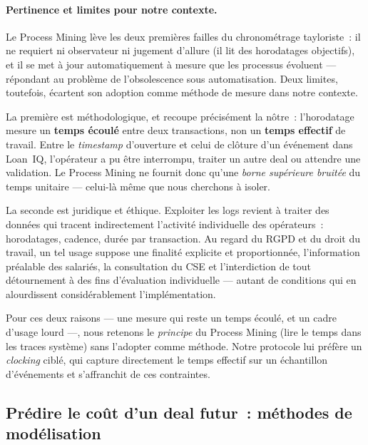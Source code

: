 \paragraph{Pertinence et limites pour notre contexte.}
Le Process Mining lève les deux premières failles du chronométrage tayloriste~: il
ne requiert ni observateur ni jugement d'allure (il lit des horodatages objectifs), et
il se met à jour automatiquement à mesure que les processus évoluent --- répondant au
problème de l'obsolescence sous automatisation. Deux limites, toutefois, écartent son
adoption comme méthode de mesure dans notre contexte.

La première est méthodologique, et recoupe précisément la nôtre~: l'horodatage mesure
un \textbf{temps écoulé} entre deux transactions, non un \textbf{temps effectif} de
travail. Entre le \textit{timestamp} d'ouverture et celui de clôture d'un événement dans
Loan~IQ, l'opérateur a pu être interrompu, traiter un autre deal ou attendre une
validation. Le Process Mining ne fournit donc qu'une \emph{borne supérieure bruitée} du
temps unitaire --- celui-là même que nous cherchons à isoler.

La seconde est juridique et éthique. Exploiter les logs revient à traiter des données
qui tracent indirectement l'activité individuelle des opérateurs~: horodatages, cadence,
durée par transaction. Au regard du RGPD et du droit du travail, un tel usage suppose une
finalité explicite et proportionnée, l'information préalable des salariés, la consultation
du CSE et l'interdiction de tout détournement à des fins d'évaluation individuelle ---
autant de conditions qui en alourdissent considérablement l'implémentation.

Pour ces deux raisons --- une mesure qui reste un temps écoulé, et un cadre d'usage lourd
---, nous retenons le \emph{principe} du Process Mining (lire le temps dans les traces
système) sans l'adopter comme méthode. Notre protocole lui préfère un \textit{clocking}
ciblé, qui capture directement le temps effectif sur un échantillon d'événements et
s'affranchit de ces contraintes.


\subsection{Prédire le coût d'un deal futur~: méthodes de modélisation}
\label{sec:prediction}

